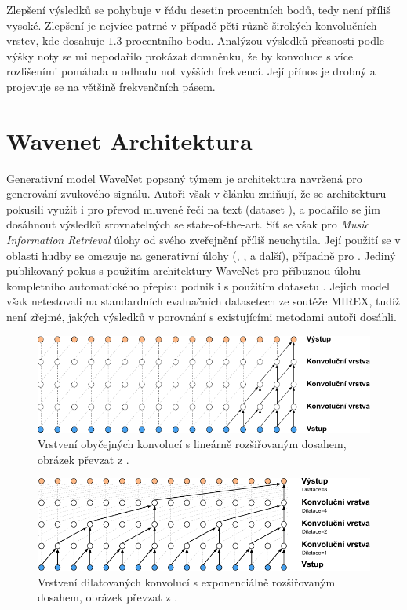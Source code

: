 Zlepšení výsledků se pohybuje v řádu desetin procentních bodů, tedy není příliš vysoké. Zlepšení je nejvíce patrné v případě pěti různě širokých konvolučních vrstev, kde dosahuje $1.3$ procentního bodu. Analýzou výsledků přesnosti podle výšky noty se mi nepodařilo prokázat domněnku, že by konvoluce s více rozlišeními pomáhala u odhadu not vyšších frekvencí. Její přínos je drobný a projevuje se na většině frekvenčních pásem.


\section{Wavenet Architektura}

Generativní model WaveNet popsaný týmem \cite{Oord2016} je architektura navržená pro generování zvukového signálu. Autoři však v článku zmiňují, že se architekturu pokusili využít i pro převod mluvené řeči na text (dataset ), a podařilo se jim dosáhnout výsledků srovnatelných se state-of-the-art. Síť se však pro \emph{Music Information Retrieval} úlohy od svého zveřejnění příliš neuchytila. Její použití se v oblasti hudby se omezuje na generativní úlohy (\cite{Hawthorne2018a}, \cite{Yang2017}, \cite{Engel2017} a další), případně pro  \citep{Stoller2018}. Jediný publikovaný pokus s použitím architektury WaveNet pro příbuznou úlohu kompletního automatického přepisu podnikli \cite{Martak2018} s použitím datasetu . Jejich model však netestovali na standardních evaluačních datasetech ze soutěže MIREX, tudíž není zřejmé, jakých výsledků v porovnání s existujícími metodami autoři dosáhli.

\begin{figure}[h]\centering
\includegraphics{../img/wavenet_konvoluce}
\caption{Vrstvení obyčejných konvolucí s lineárně rozšiřovaným dosahem, obrázek převzat z \cite{Oord2016}.}
\label{obr:wavenet_conv}
\end{figure}

\begin{figure}[h]\centering
\includegraphics{../img/wavenet_dilatace_konvoluce}
\caption{Vrstvení dilatovaných konvolucí s exponenciálně rozšiřovaným dosahem, obrázek převzat z \cite{Oord2016}.}
\label{obr:wavenet_dilated}
\end{figure}

